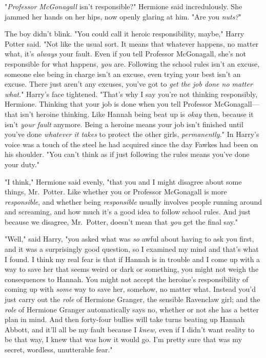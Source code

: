 "\emph{Professor McGonagall} isn't responsible?" Hermione said incredulously.
She jammed her hands on her hips, now openly glaring at him. "Are you
\emph{nuts?}"

The boy didn't blink. "You could call it heroic responsibility, maybe," Harry
Potter said. "Not like the usual sort. It means that whatever happens, no
matter what, it's \emph{always} your fault. Even if you tell Professor
McGonagall, she's not responsible for what happens, \emph{you} are. Following
the school rules isn't an excuse, someone else being in charge isn't an excuse,
even trying your best isn't an excuse. There just aren't any excuses, you've
got to \emph{get the job done no matter what}." Harry's face tightened. "That's
why I say you're not thinking responsibly, Hermione. Thinking that your job is
done when you tell Professor McGonagall---that isn't heroine thinking. Like
Hannah being beat up is \emph{okay} then, because it isn't \emph{your fault}
anymore. Being a heroine means your job isn't finished until you've done \emph{
whatever it takes} to protect the other girls, \emph{permanently.}" In Harry's
voice was a touch of the steel he had acquired since the day Fawkes had been on
his shoulder. "You can't think as if just following the rules means you've done
your duty."

"I think," Hermione said evenly, "that you and I might disagree about some
things, Mr.~Potter. Like whether you or Professor McGonagall is more
\emph{responsible}, and whether being \emph{responsible} usually involves
people running around and screaming, and how much it's a good idea to follow
school rules. And just because we disagree, Mr.~Potter, doesn't mean that
\emph{you} get the final say."

"Well," said Harry, "you asked what was \emph{so} awful about having to ask you
first, and it was a surprisingly good question, so I examined my mind and
that's what I found. I think my real fear is that if Hannah is in trouble and I
come up with a way to save her that seems weird or dark or something, you might
not weigh the consequences to Hannah. You might not accept the heroine's
responsibility of coming up with \emph{some} way to save her, somehow, no
matter what. Instead you'd just carry out the \emph{role} of Hermione Granger,
the sensible Ravenclaw girl; and the \emph{role} of Hermione Granger
automatically says no, whether or not she has a better plan in mind. And then
forty-four bullies will take turns beating up Hannah Abbott, and it'll all be
my fault because I \emph{knew,} even if I didn't want reality to be that way, I
knew that was how it would go. I'm pretty sure that was my secret, wordless,
unutterable fear."

